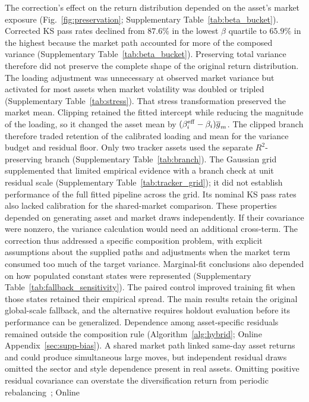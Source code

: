 The correction's effect on the return distribution depended on the
asset's market exposure (Fig.~\ref{fig:preservation};
Supplementary Table~\ref{tab:beta_bucket}). Corrected KS pass rates declined from
$87.6\%$ in the lowest $\beta$ quartile to $65.9\%$ in the highest
because the market path accounted for more of the composed variance
(Supplementary Table~\ref{tab:beta_bucket}). Preserving total variance therefore
did not preserve the complete shape of the original return
distribution. The loading adjustment was unnecessary at observed
market variance but activated for most assets when market volatility
was doubled or tripled (Supplementary Table~\ref{tab:stress}). That stress
transformation preserved the market mean. Clipping retained the
fitted intercept while reducing the magnitude of the loading, so it
changed the asset mean by
$(\beta_i^{\mathrm{eff}}-\beta_i)\overline{g}_m$. The clipped branch therefore
traded retention of the calibrated loading and mean for the
variance budget and residual floor. Only two tracker
assets used the separate $R^2$-preserving branch
(Supplementary Table~\ref{tab:branch}). The Gaussian grid supplemented that limited
empirical evidence with a branch check at unit residual scale
(Supplementary Table~\ref{tab:tracker_grid}); it did not establish performance of the
full fitted pipeline across the grid. Its nominal KS pass rates also
lacked calibration for the shared-market comparison. These properties depended on
generating asset and market draws independently. If their covariance
were nonzero, the variance calculation would need an additional
cross-term. The correction thus addressed a specific composition
problem, with explicit assumptions about the supplied paths and
adjustments when the market term consumed too much of the target
variance.
Marginal-fit conclusions also depended on how populated constant
states were represented (Supplementary Table~\ref{tab:fallback_sensitivity}). The paired control improved training fit
when those states retained their empirical spread. The main results
retain the original global-scale fallback, and the alternative
requires holdout evaluation before its performance can be generalized.
Dependence among asset-specific residuals remained outside the
composition rule (Algorithm~\ref{alg:hybrid}; Online
Appendix~\ref{sec:supp-bias}). A shared market path linked same-day asset returns and
could produce simultaneous large moves, but independent residual
draws omitted the sector and style dependence present in real assets.
Omitting positive residual covariance can overstate the diversification
return from periodic rebalancing~\cite{boothFama1992,
boucheyNemtchinovWong2015, markowitz1976longRun}; Online
